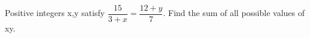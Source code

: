 Positive integers x,y satisfy $\dfrac{15}{3+x}=\dfrac{12+y}{7}$. Find the sum of all possible values of xy.
